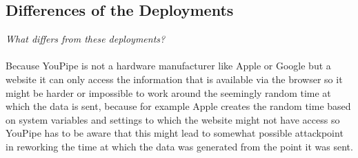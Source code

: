 \documentclass{report}
\begin{document}
		\subsection{Differences of the Deployments}
		\startsubsection
			\textit{What differs from these deployments?} \\ \\
			Because YouPipe is not a hardware manufacturer like Apple or Google but a website it can only access the information that is available via the browser so it might be harder or impossible to work around the seemingly random time at which the data is sent, because for example Apple creates the random time based on system variables and settings to which the website might not have access so YouPipe has to be aware that this might lead to somewhat possible attackpoint in reworking the time at which the data was generated from the point it was sent.
		\closesection
	\closesection
\end{document}
